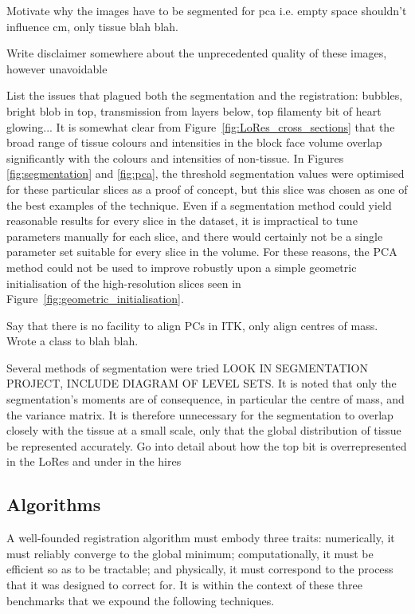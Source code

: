     Motivate why the images have to be segmented for pca i.e. empty space shouldn't influence cm, only tissue blah blah.
    
    Write disclaimer somewhere about the unprecedented quality of these images, however unavoidable 
    
    List the issues that plagued both the segmentation and the registration: bubbles, bright blob in top, transmission from layers below, top filamenty bit of heart glowing...
    It is somewhat clear from Figure~\ref{fig:LoRes_cross_sections} that the broad range of tissue colours and intensities in the block face volume overlap significantly with the colours and intensities of non-tissue. In Figures \ref{fig:segmentation} and \ref{fig:pca}, the threshold segmentation values were optimised for these particular slices as a proof of concept, but this slice was chosen as one of the best examples of the technique. Even if a segmentation method could yield reasonable results for every slice in the dataset, it is impractical to tune parameters manually for each slice, and there would certainly not be a single parameter set suitable for every slice in the volume. For these reasons, the PCA method could not be used to improve robustly upon a simple geometric initialisation of the high-resolution slices seen in Figure~\ref{fig:geometric_initialisation}.
    
    Say that there is no facility to align PCs in ITK, only align centres of mass. Wrote a class to blah blah.
    
    Several methods of segmentation were tried LOOK IN SEGMENTATION PROJECT, INCLUDE DIAGRAM OF LEVEL SETS. It is noted that only the segmentation's moments are of consequence, in particular the centre of mass, and the variance matrix. It is therefore unnecessary for the segmentation to overlap closely with the tissue at a small scale, only that the global distribution of tissue be represented accurately. Go into detail about how the top bit is overrepresented in the LoRes and under in the hires
        
   
  \subsection{Algorithms} %
  \label{sub:algorithms}
    A well-founded registration algorithm must embody three traits: numerically, it must reliably converge to the global minimum; computationally, it must be efficient so as to be tractable; and physically, it must correspond to the process that it was designed to correct for. It is within the context of these three benchmarks that we expound the following techniques.

